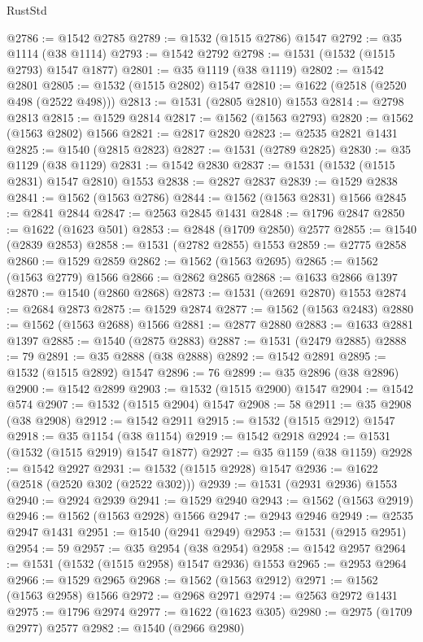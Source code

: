 \begin{lexlean}{RustStd}
\begin{coremodule}
@2786 := @1542 @2785
@2789 := @1532 (@1515 @2786) @1547
@2792 := @35 @1114 (@38 @1114)
@2793 := @1542 @2792
@2798 := @1531 (@1532 (@1515 @2793) @1547 @1877)
@2801 := @35 @1119 (@38 @1119)
@2802 := @1542 @2801
@2805 := @1532 (@1515 @2802) @1547
@2810 := @1622 (@2518 (@2520 @498 (@2522 @498)))
@2813 := @1531 (@2805 @2810) @1553
@2814 := @2798 @2813
@2815 := @1529 @2814
@2817 := @1562 (@1563 @2793)
@2820 := @1562 (@1563 @2802) @1566
@2821 := @2817 @2820
@2823 := @2535 @2821 @1431
@2825 := @1540 (@2815 @2823)
@2827 := @1531 (@2789 @2825)
@2830 := @35 @1129 (@38 @1129)
@2831 := @1542 @2830
@2837 := @1531 (@1532 (@1515 @2831) @1547 @2810) @1553
@2838 := @2827 @2837
@2839 := @1529 @2838
@2841 := @1562 (@1563 @2786)
@2844 := @1562 (@1563 @2831) @1566
@2845 := @2841 @2844
@2847 := @2563 @2845 @1431
@2848 := @1796 @2847
@2850 := @1622 (@1623 @501)
@2853 := @2848 (@1709 @2850) @2577
@2855 := @1540 (@2839 @2853)
@2858 := @1531 (@2782 @2855) @1553
@2859 := @2775 @2858
@2860 := @1529 @2859
@2862 := @1562 (@1563 @2695)
@2865 := @1562 (@1563 @2779) @1566
@2866 := @2862 @2865
@2868 := @1633 @2866 @1397
@2870 := @1540 (@2860 @2868)
@2873 := @1531 (@2691 @2870) @1553
@2874 := @2684 @2873
@2875 := @1529 @2874
@2877 := @1562 (@1563 @2483)
@2880 := @1562 (@1563 @2688) @1566
@2881 := @2877 @2880
@2883 := @1633 @2881 @1397
@2885 := @1540 (@2875 @2883)
@2887 := @1531 (@2479 @2885)
@2888 := 79
@2891 := @35 @2888 (@38 @2888)
@2892 := @1542 @2891
@2895 := @1532 (@1515 @2892) @1547
@2896 := 76
@2899 := @35 @2896 (@38 @2896)
@2900 := @1542 @2899
@2903 := @1532 (@1515 @2900) @1547
@2904 := @1542 @574
@2907 := @1532 (@1515 @2904) @1547
@2908 := 58
@2911 := @35 @2908 (@38 @2908)
@2912 := @1542 @2911
@2915 := @1532 (@1515 @2912) @1547
@2918 := @35 @1154 (@38 @1154)
@2919 := @1542 @2918
@2924 := @1531 (@1532 (@1515 @2919) @1547 @1877)
@2927 := @35 @1159 (@38 @1159)
@2928 := @1542 @2927
@2931 := @1532 (@1515 @2928) @1547
@2936 := @1622 (@2518 (@2520 @302 (@2522 @302)))
@2939 := @1531 (@2931 @2936) @1553
@2940 := @2924 @2939
@2941 := @1529 @2940
@2943 := @1562 (@1563 @2919)
@2946 := @1562 (@1563 @2928) @1566
@2947 := @2943 @2946
@2949 := @2535 @2947 @1431
@2951 := @1540 (@2941 @2949)
@2953 := @1531 (@2915 @2951)
@2954 := 59
@2957 := @35 @2954 (@38 @2954)
@2958 := @1542 @2957
@2964 := @1531 (@1532 (@1515 @2958) @1547 @2936) @1553
@2965 := @2953 @2964
@2966 := @1529 @2965
@2968 := @1562 (@1563 @2912)
@2971 := @1562 (@1563 @2958) @1566
@2972 := @2968 @2971
@2974 := @2563 @2972 @1431
@2975 := @1796 @2974
@2977 := @1622 (@1623 @305)
@2980 := @2975 (@1709 @2977) @2577
@2982 := @1540 (@2966 @2980)

\end{coremodule}
\end{lexlean}
